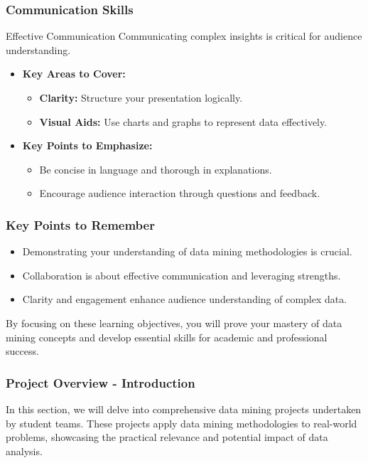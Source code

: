 \documentclass[aspectratio=169]{beamer}
\begin{document}
\begin{frame}[fragile]
    \frametitle{Communication Skills}
    \begin{block}{Effective Communication}
        Communicating complex insights is critical for audience understanding.
    \end{block}

    \begin{itemize}
        \item \textbf{Key Areas to Cover:}
        \begin{itemize}
            \item \textbf{Clarity:} Structure your presentation logically.
            \item \textbf{Visual Aids:} Use charts and graphs to represent data effectively.
        \end{itemize}
        
        \item \textbf{Key Points to Emphasize:}
        \begin{itemize}
            \item Be concise in language and thorough in explanations.
            \item Encourage audience interaction through questions and feedback.
        \end{itemize}
    \end{itemize}
\end{frame}

\begin{frame}[fragile]
    \frametitle{Key Points to Remember}
    \begin{itemize}
        \item Demonstrating your understanding of data mining methodologies is crucial.
        \item Collaboration is about effective communication and leveraging strengths.
        \item Clarity and engagement enhance audience understanding of complex data.
    \end{itemize}

    By focusing on these learning objectives, you will prove your mastery of data mining concepts and develop essential skills for academic and professional success.
\end{frame}

\begin{frame}[fragile]
    \frametitle{Project Overview - Introduction}
    In this section, we will delve into comprehensive data mining projects undertaken by student teams. These projects apply data mining methodologies to real-world problems, showcasing the practical relevance and potential impact of data analysis.
\end{frame}
\end{document}
